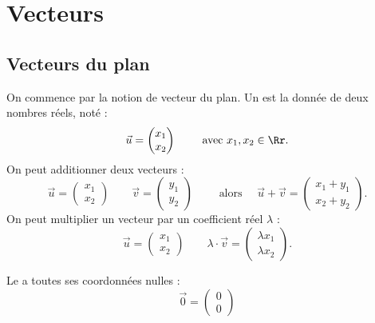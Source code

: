 \documentclass[11pt,class=report,crop=false]{standalone}
\begin{document}



\section{Vecteurs}


\subsection{Vecteurs du plan}

On commence par la notion de vecteur du plan.
Un  est la donnée de deux nombres réels, noté :
$$\vec u = \begin{pmatrix}x_1 \\ x_2\end{pmatrix} \qquad \text{ avec } x_1,x_2 \in \Rr.$$
On peut additionner deux vecteurs :
$$\vec u = \begin{pmatrix}x_1 \\ x_2\end{pmatrix} \qquad 
\vec v = \begin{pmatrix}y_1 \\ y_2\end{pmatrix}
 \qquad \text{ alors } \quad \vec u+\vec v = \begin{pmatrix}x_1+y_1 \\ x_2+y_2\end{pmatrix}.$$
On peut multiplier un vecteur par un coefficient réel $\lambda$ :
$$\vec u = \begin{pmatrix}x_1 \\ x_2\end{pmatrix} \qquad
\lambda \cdot \vec v = \begin{pmatrix}\lambda x_1 \\ \lambda x_2\end{pmatrix}.$$


Le  a toutes ses coordonnées nulles :
$$\vec 0 = \begin{pmatrix}0 \\ 0\end{pmatrix}$$
\end{document}
